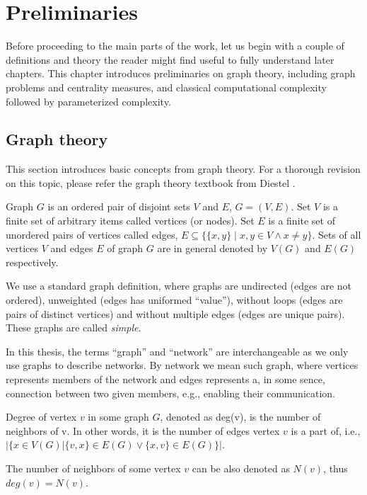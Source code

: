 \chapter{Preliminaries}

Before proceeding to the main parts of the work,
let us begin with a couple of definitions and theory the reader might find useful to fully understand later chapters.
This chapter introduces preliminaries on graph theory, including graph problems and centrality measures, and 
classical computational complexity followed by parameterized complexity.


\section{Graph theory}

This section introduces basic concepts from graph theory.
For a thorough revision on this topic, please refer the graph theory textbook from Diestel \cite{Diestel2018}.

\begin{definition}[Graph]
    Graph $G$ is an ordered pair of disjoint sets $V$ and $E$, $G=(V,E)$.
    Set $V$ is a finite set of arbitrary items called vertices (or nodes).
    Set $E$ is a finite set of unordered pairs of vertices called edges, $E \subseteq \{\{x,y\} \mid x,y \in V \wedge x \neq y\}$.
    Sets of all vertices $V$ and edges $E$ of graph $G$ are in general denoted by $V(G)$ and $E(G)$ respectively.
\end{definition}
We use a standard graph definition, where graphs are undirected (edges are not ordered),
unweighted (edges has uniformed ``value''), without loops (edges are pairs of distinct vertices) and
without multiple edges (edges are unique pairs).
These graphs are called \emph{simple}.

In this thesis, the terms ``graph'' and ``network'' are interchangeable as we only use graphs to describe networks.
By network we mean such graph, where vertices represents members of the network 
and edges represents a, in some sence, connection between two given members, e.g., enabling their communication.

\begin{definition}
    Degree of vertex $v$ in some graph $G$, denoted as deg(v), is the number of neighbors of v.
    In other words, it is the number of edges vertex $v$ is a part of, i.e.,
    $\Big|\{x \in V(G) \vert \{v,x\} \in E(G) \vee \{x,v\} \in E(G)\}\Big|$.
\end{definition}
The number of neighbors of some vertex $v$ can be also denoted as $N(v)$, thus $deg(v) = N(v)$.

